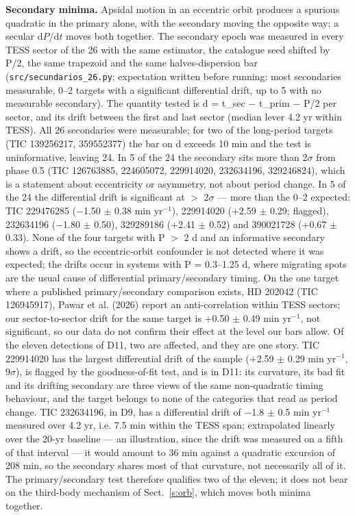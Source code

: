 \documentclass{aa}
\begin{document}
\textbf{Secondary minima.} Apsidal motion in an eccentric orbit produces a spurious quadratic in the primary alone, with the secondary moving the opposite way; a secular $\mathrm{d}P/\mathrm{d}t$ moves both together. The secondary epoch was measured in every TESS sector of the 26 with the same estimator, the catalogue seed shifted by P/2, the same trapezoid and the same halves-dispersion bar (\texttt{src/secundarios\_26.py}; expectation written before running: most secondaries measurable, 0--2 targets with a significant differential drift, up to 5 with no measurable secondary). The quantity tested is d = t\_sec $-$ t\_prim $-$ P/2 per sector, and its drift between the first and last sector (median lever 4.2 yr within TESS). All 26 secondaries were measurable; for two of the long-period targets (TIC 139256217, 359552377) the bar on d exceeds 10 min and the test is uninformative, leaving 24. In 5 of the 24 the secondary sits more than 2$\sigma$ from phase 0.5 (TIC 126763885, 224605072, 229914020, 232634196, 329246824), which is a statement about eccentricity or asymmetry, not about period change. In 5 of the 24 the differential drift is significant at $>$ 2$\sigma$ --- more than the 0--2 expected: TIC 229476285 ($-$1.50 $\pm$ 0.38 min yr$^{-1}$), 229914020 (+2.59 $\pm$ 0.29; flagged), 232634196 ($-$1.80 $\pm$ 0.50), 329289186 (+2.41 $\pm$ 0.52) and 390021728 (+0.67 $\pm$ 0.33). None of the four targets with P $>$ 2 d and an informative secondary shows a drift, so the eccentric-orbit confounder is not detected where it was expected; the drifts occur in systems with P = 0.3--1.25 d, where migrating spots are the usual cause of differential primary/secondary timing. On the one target where a published primary/secondary comparison exists, HD 202042 (TIC 126945917), Pawar et al. (2026) report an anti-correlation within TESS sectors; our sector-to-sector drift for the same target is +0.50 $\pm$ 0.49 min yr$^{-1}$, not significant, so our data do not confirm their effect at the level our bars allow. Of the eleven detections of D11, two are affected, and they are one story. TIC 229914020 has the largest differential drift of the sample (+2.59 $\pm$ 0.29 min yr$^{-1}$, 9$\sigma$), is flagged by the goodness-of-fit test, and is in D11: its curvature, its bad fit and its drifting secondary are three views of the same non-quadratic timing behaviour, and the target belongs to none of the categories that read as period change. TIC 232634196, in D9, has a differential drift of $-$1.8 $\pm$ 0.5 min yr$^{-1}$ measured over 4.2 yr, i.e. 7.5 min within the TESS span; extrapolated linearly over the 20-yr baseline --- an illustration, since the drift was measured on a fifth of that interval --- it would amount to 36 min against a quadratic excursion of 208 min, so the secondary shares most of that curvature, not necessarily all of it. The primary/secondary test therefore qualifies two of the eleven; it does not bear on the third-body mechanism of Sect.~\ref{s:orb}, which moves both minima together.
\end{document}
